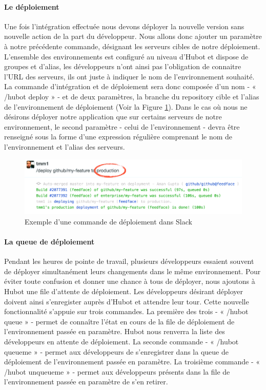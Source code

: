           \paragraph{Le déploiement} Une fois l'intégration effectuée nous devons déployer la nouvelle version sans nouvelle action de la part du développeur. Nous allons donc ajouter un paramètre à notre précédente commande, désignant les serveurs cibles de notre déploiement. L'ensemble des environnements est configuré au niveau d'Hubot et dispose de groupes et d'alias, les développeurs n'ont ainsi pas l'obligation de connaitre l'URL des serveurs, ils ont juste à indiquer le nom de l'environnement souhaité.
          La commande d'intégration et de déploiement sera donc composée d'un nom - « /hubot deploy » - et de deux paramètres, la branche du repository cible et l'alias de l'environnement de déploiement (Voir la Figure \ref{SlackDeploy}).
          Dans le cas où nous ne désirons déployer notre application que sur certains serveurs de notre environnement, le second paramètre - celui de l'environnement - devra être renseigné sous la forme d'une expression régulière comprenant le nom de l'environnement et l'alias des serveurs.

          \begin{figure}
            \begin{center}
              \includegraphics[scale=0.5]{images/SlackDeploy.png}
            \end{center}
            \caption{Exemple d'une commande de déploiement dans Slack}
            \label{SlackDeploy}
          \end{figure}

          \paragraph{La queue de déploiement} Pendant les heures de pointe de travail, plusieurs développeurs essaient souvent de déployer simultanément leurs changements dans le même environnement. Pour éviter toute confusion et donner une chance à tous de déployer, nous ajoutons à Hubot une file d'attente de déploiement. Les développeurs désirant déployer doivent ainsi s'enregister auprès d'Hubot et attendre leur tour. Cette nouvelle fonctionnalité s'appuie sur trois commandes.
          La première des trois - « /hubot queue » - permet de connaître l'état en cours de la file de déploiement de l'environnement passée en paramètre. Hubot nous renverra la liste des développeurs en attente de déploiement.
          La seconde commande - « /hubot queueme » - permet aux développeurs de s'enregistrer dans la queue de déploiement de l'environnement passée en paramètre.
          La troisième commande - « /hubot unqueueme » - permet aux développeurs présents dans la file de l'environnement passée en paramètre de s'en retirer.

